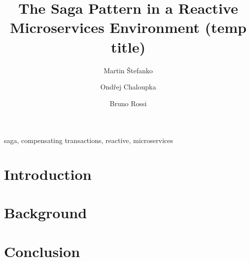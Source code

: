\documentclass[5p]{elsarticle}
\begin{document}
\begin{frontmatter}

\title{The Saga Pattern in a
Reactive Microservices
Environment (temp title)}

 \author[firstaddress]{Martin Štefanko}

 \author[secondaddress]{Ondřej Chaloupka}
 \author[firstaddress]{Bruno Rossi}

 \address[firstaddress]{Masaryk University, Faculty of Informatics, Brno, Czech Republic}
 
 \address[secondaddress]{Red Hat, Brno, Czech Republic}

\begin{abstract}

\end{abstract}

\begin{keyword}
saga, compensating transactions, reactive, microservices
\end{keyword}

\end{frontmatter}


\section{Introduction}

 
\section{Background}

 




\section{Conclusion} 
% 
\end{document}
